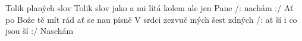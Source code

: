 \begin{TEXT}{Tolik planých slov}
\SLOKA[] Tolik  slov jako  a  \NL
mi lítá kolem  \NL
ale  jen Pane   \NL
/: nachám   :/ \NL
Ať po Bože                 tě mít rád \NL
ať se  nau  písně   \NL
V srdci zezvuč mých šest zdných  \NL
/: ať ší i  co jsou ší :/ \NL
Naschám    
\end{TEXT}
